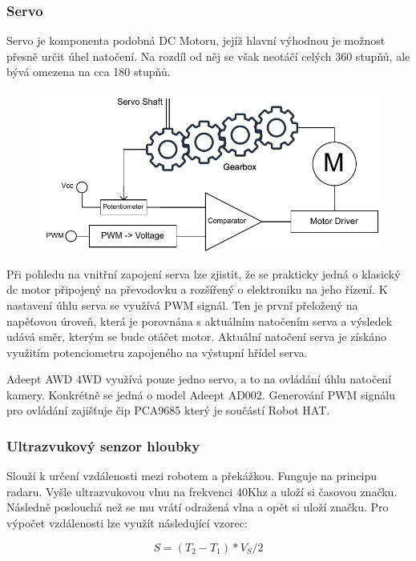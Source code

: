 \subsubsection*{Servo}
Servo je komponenta podobná DC Motoru, jejíž hlavní výhodnou je možnost přesně určit úhel natočení. Na rozdíl od něj se však neotáčí celých 360 stupňů, ale bývá omezena na cca 180 stupňů.

\begin{figure}[h!]
	\centering
	\includegraphics[scale=0.9]{obrazky-figures/servo.pdf}
	\caption{}
	\label{}
\end{figure}
Při pohledu na vnitřní zapojení serva lze zjistit, že se prakticky jedná o klasický dc motor připojený na převodovku a rozšířený o elektroniku na jeho řízení. K nastavení úhlu serva se využívá PWM signál. Ten je první přeložený na napěťovou úroveň, která je porovnána s aktuálním natočením serva a výsledek udává směr, kterým se bude otáčet motor. Aktuální natočení serva je získáno využitím potenciometru zapojeného na výstupní hřídel serva. \cite{embeded_robotics}

Adeept AWD 4WD využívá pouze jedno servo, a to na ovládání úhlu natočení kamery. Konkrétně se jedná o model Adeept AD002. Generování PWM signálu pro ovládání zajišťuje čip PCA9685 který je součástí Robot HAT.

\subsubsection*{Ultrazvukový senzor hloubky}
Slouží k určení vzdálenosti mezi robotem a překážkou. Funguje na principu radaru. Vyšle ultrazvukovou vlnu na frekvenci 40Khz %
a uloží si časovou značku. Následně poslouchá než se mu vrátí odražená vlna a opět si uloží značku.
Pro výpočet vzdálenosti lze využít následující vzorec:

$$S = (T_2 - T_1) * V_S / 2$$

